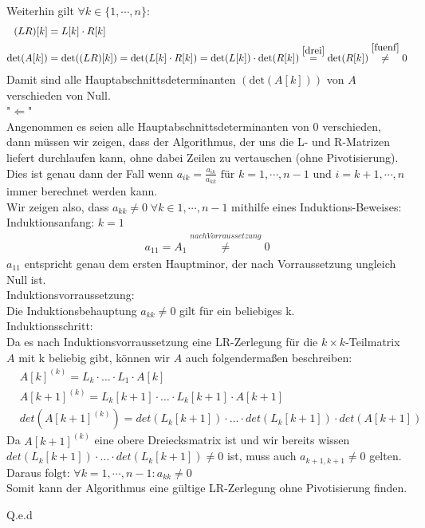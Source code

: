 Weiterhin gilt $\forall k \in\{1,\cdots,n\}$:
\begin{align}
(LR)[k]&=L[k]\cdot R[k]\\
\mathrm{det}(A[k])&=\mathrm{det}((LR)[k])= \mathrm{det}(L[k]\cdot R[k])= \mathrm{det}(L[k])\cdot\mathrm{det}(R[k]) \overset{\eqref{drei}}{=} \mathrm{det}(R[k])\overset{\eqref{fuenf}}{\neq}0
\end{align}
Damit sind alle Hauptabschnittsdeterminanten $\left(\mathrm{det}(A[k])\right)$ von $A$ verschieden von Null.\\
\newline
"$\Leftarrow$"\\
Angenommen es seien alle Hauptabschnittsdeterminanten von 0 verschieden, dann m\"ussen wir zeigen, dass der Algorithmus, der uns die L- und R-Matrizen liefert durchlaufen kann, ohne dabei Zeilen zu vertauschen (ohne Pivotisierung). Dies ist genau dann der Fall wenn $a_{ik}=\frac{a_{ik}}{a_{kk}} \text{ für }k=1,\cdots,n-1 \text{ und } i =k+1,\cdots,n$ immer berechnet werden kann.\\
Wir zeigen also, dass $a_{kk} \neq 0 \;\forall k \in {1, \cdots, n-1}$ mithilfe eines Induktions-Beweises:\\\newline
Induktionsanfang: $k=1$
\begin{align*}
a_{11} = A_1 \overset{nach Vorraussetzung}{\neq} 0
\end{align*}
$a_{11}$ entspricht genau dem ersten Hauptminor, der nach Vorraussetzung ungleich Null ist.\\\newline
Induktionsvorraussetzung:\\
Die Induktionsbehauptung $a_{kk} \neq 0$ gilt für ein beliebiges k.\\\newline
Induktionsschritt:\\
Da es nach Induktionsvorraussetzung eine LR-Zerlegung für die $k\times k$-Teilmatrix $A$ mit k beliebig gibt, können wir $A$ auch folgenderma{\ss}en beschreiben:
\begin{align*}
&A[k]^{(k)}= L_k \cdot \ldots \cdot L_1 \cdot A[k]\\
&A[k+1]^{(k)} = L_k[k+1] \cdot \ldots \cdot L_k[k+1] \cdot A[k+1]\\
&det(A[k+1]^{(k)})=det(L_k[k+1])\cdot \ldots \cdot det(L_k[k+1]) \cdot det(A[k+1])
\end{align*}
Da $A[k+1]^{(k)}$ eine obere Dreiecksmatrix ist und wir bereits wissen $det(L_k[k+1])\cdot \ldots \cdot det(L_k[k+1])\neq 0$ ist, muss auch $a_{k+1,k+1} \neq 0$ gelten.\\
Daraus folgt: $\forall k = 1, \cdots, n-1: a_{kk} \neq 0$\\
Somit kann der Algorithmus eine gültige LR-Zerlegung ohne Pivotisierung finden.
\begin{flushright}
Q.e.d
\end{flushright}


